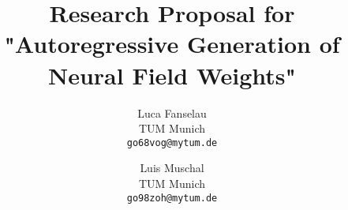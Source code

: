 \documentclass[10pt,twocolumn,letterpaper]{article}
\title{Research Proposal for "Autoregressive Generation of Neural Field Weights"}
\author{Luca Fanselau\\
TUM Munich\\
{\tt\small go68vog@mytum.de}
\and
Luis Muschal\\
TUM Munich\\
{\tt\small go98zoh@mytum.de}
}
\begin{document}
\maketitle







{
    \small
    
    
}

% 
\end{document}
